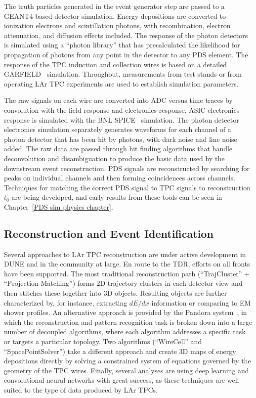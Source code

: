 The truth particles generated in the event generator step are passed to a {\sc GEANT4}-based detector simulation.  Energy depositions are converted to ionization electrons and scintillation photons, with recombination, electron attenuation, and diffusion effects included.  The response of the photon detectors is simulated using a ``photon library'' that has precalculated the likelihood for propagation of photons from any point in the detector to any PDS element.  The response of the TPC induction and collection wires is based on a detailed GARFIELD~\cite{garfield} simulation.  Throughout, measurements from test stands or from operating LAr TPC experiments are used to establish simulation parameters.

The raw signals on each wire are converted into ADC versus time traces by convolution with the field response and electronics response.  ASIC electronics response is simulated with the BNL SPICE~\cite{spice} simulation.  The photon detector electronics simulation separately generates waveforms for each channel of a photon detector that has been hit by photons, with dark noise and line noise added.  The raw data are passed through hit finding algorithms that handle deconvolution and disambiguation to produce the basic data used by the downstream event reconstruction. PDS signals are reconstructed by searching for peaks on individual channels and then forming coincidences across channels. Techniques for matching the correct PDS signal to TPC signals to reconstruction $t_0$ are being developed, and early results from these tools can be seen in Chapter~\ref{PDS sim physics chapter}.

\subsection{Reconstruction and Event Identification}
Several approaches to LAr TPC reconstruction are under active development in DUNE and in the community at large.  En route to the TDR, efforts on all fronts have been supported.  The most traditional reconstruction path (``TrajCluster'' + ``Projection Matching'') forms 2D trajectory clusters in each detector view and then stitches these together into 3D objects.  Resulting objects are further characterized by, for instance, extracting $dE/dx$ information or comparing to EM shower profiles.  An alternative approach is provided by the Pandora system~\cite{Marshall:2015rfa}, in which the reconstruction and pattern recognition task is broken down into a large number of decoupled algorithms, where each algorithm addresses a specific task or targets a particular topology.  Two algorithms (``WireCell'' and ``SpacePointSolver'') take a different approach and create 3D maps of energy depositions directly by solving a constrained system of equations governed by the geometry of the TPC wires.  Finally, several analyses are using deep learning and convolutional neural networks with great success, as these techniques are well suited to the type of data produced by LAr TPCs.


